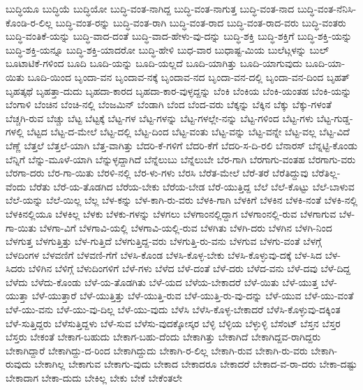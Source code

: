 {ಬುದ್ಧಿಯೂ
ಬುದ್ಧಿಯೆ
ಬುದ್ಧಿಯೋ
ಬುದ್ಧಿ-ವಂತ-ನಾಗಿದ್ದ
ಬುದ್ಧಿ-ವಂತ-ನಾಗುತ್ತ
ಬುದ್ಧಿ-ವಂತ-ನಾದ
ಬುದ್ಧಿ-ವಂತ-ನೆನಿಸಿ-ಕೊಂಡಿ-ರ-ಲಿಲ್ಲ
ಬುದ್ಧಿ-ವಂತ-ರನ್ನು
ಬುದ್ಧಿ-ವಂತ-ರಾಗಿ
ಬುದ್ಧಿ-ವಂತ-ರಾದ
ಬುದ್ಧಿ-ವಂತ-ರಾದ-ವರು
ಬುದ್ಧಿ-ವಂತರು
ಬುದ್ಧಿ-ವಂತಿಕೆ-ಯನ್ನು
ಬುದ್ಧಿ-ವಾದ-ದಂತೆ
ಬುದ್ಧಿ-ವಾದ-ಹೇಳು-ವು-ದನ್ನು
ಬುದ್ಧಿ-ಶಕ್ತಿ
ಬುದ್ಧಿ-ಶಕ್ತಿಗೆ
ಬುದ್ಧಿ-ಶಕ್ತಿ-ಯನ್ನು
ಬುದ್ಧಿ-ಶಕ್ತಿ-ಯನ್ನೂ
ಬುದ್ಧಿ-ಶಕ್ತಿ-ಯಾದರೋ
ಬುದ್ಧಿ-ಹೇಳಿ
ಬುಧ-ವಾರ
ಬುಧಾಷ್ಟ-ಮಿಯ
ಬುಲೆಟ್ಗಳನ್ನು
ಬುಲ್
ಬೂಟಾಟಿಕೆ-ಗಳಿಂದ
ಬೂದಿ
ಬೂದಿ-ಯನ್ನು
ಬೂದಿ-ಯಲ್ಲದೆ
ಬೂದಿ-ಯಾಗಿತ್ತು
ಬೂದಿ-ಯಾಗುವುದು
ಬೂದಿ-ಯಾ-ಯಿತು
ಬೂದಿ-ಯಿಂದ
ಬೃಂದಾ-ವನ
ಬೃಂದಾವ-ನಕ್ಕೆ
ಬೃಂದಾವ-ನದ
ಬೃಂದಾ-ವನ-ದಲ್ಲಿ
ಬೃಂದಾ-ವನ-ದಿಂದ
ಬೃಹತ್
ಬೃಹತ್ಕಥೆ
ಬೃಹತ್ತಾ-ದುದು
ಬೃಹದಾ-ಕಾರದ
ಬೃಹದಾ-ಕಾರ-ವುಳ್ಳದ್ದನ್ನು
ಬೆಂಕಿ
ಬೆಂಕಿಯ
ಬೆಂಕಿ-ಯಂತಹ
ಬೆಂಕಿ-ಯನ್ನು
ಬೆಂಗಾಳಿ
ಬೆಂಚಿನ
ಬೆಂಚಿ-ನಲ್ಲಿ
ಬೆಂಜಮಿನ್
ಬೆಂಡಾಗಿ
ಬೆಂದ
ಬೆಂದ-ವರು
ಬೆಕ್ಕನ್ನು
ಬೆಕ್ಕಿನ
ಬೆಕ್ಕು
ಬೆಕ್ಕು-ಗಳಂತೆ
ಬೆಚ್ಚಗಿ-ರುವ
ಬೆಚ್ಚು
ಬೆಟ್ಟ
ಬೆಟ್ಟಕ್ಕೆ
ಬೆಟ್ಟ-ಗಳ
ಬೆಟ್ಟ-ಗಳನ್ನು
ಬೆಟ್ಟ-ಗಳಲ್ಲೇ-ನನ್ನು
ಬೆಟ್ಟ-ಗಳಿಂದ
ಬೆಟ್ಟ-ಗಳು
ಬೆಟ್ಟ-ಗುಡ್ಡ-ಗಳಲ್ಲಿ
ಬೆಟ್ಟದ
ಬೆಟ್ಟ-ದ-ಮೇಲೆ
ಬೆಟ್ಟ-ದಲ್ಲಿ
ಬೆಟ್ಟ-ದಿಂದ
ಬೆಟ್ಟ-ವಂತು
ಬೆಟ್ಟ-ವನ್ನು
ಬೆಟ್ಟ-ವನ್ನೇ
ಬೆಟ್ಟ-ವಲ್ಲ
ಬೆಟ್ಟ-ವಿದೆ
ಬೆಣ್ಣೆ
ಬೆತ್ತಲೆ
ಬೆತ್ತಲೆ-ಯಾಗಿ
ಬೆತ್ತ-ವಾಗಿತ್ತು
ಬೆದರಿ-ಕೆ-ಗಳಿಗೆ
ಬೆದರಿ-ಕೆಗೆ
ಬೆದರಿ-ಸ-ದಿ-ರಲಿ
ಬೆನಾರಸ್
ಬೆನ್ನಟ್ಟಿ-ಕೊಂಡು
ಬೆನ್ನಿಗೆ
ಬೆನ್ನು-ಮೂಳೆ-ಯಾಗಿ
ಬೆನ್ನುಳ್ಳದ್ದಾಗಿದೆ
ಬೆನ್ನೆಲುಬು
ಬೆನ್ನೆಲುಬೇ
ಬೆರ-ಗಾಗಿ
ಬೆರಗಾಗು-ವಂತಹ
ಬೆರಗಾಗು-ವರು
ಬೆರಗಾ-ದರು
ಬೆರ-ಗಾ-ಯಿತು
ಬೆರಳಿ-ನಲ್ಲಿ
ಬೆರ-ಳು-ಗಳು
ಬೆರಸಿ
ಬೆರೆತ-ಮೇಲೆ
ಬೆರೆ-ತರೆ
ಬೆರೆತಿದ್ದುವು
ಬೆರೆತಿಲ್ಲ-ವೆಂದು
ಬೆರೆತು
ಬೆರೆ-ಯ-ತೊಡಗಿದ
ಬೆರೆಯ-ಬೇಕು
ಬೆರೆಯ-ಬೇಡ
ಬೆರೆ-ಯುತ್ತಿದ್ದ
ಬೆಲೆ
ಬೆಲೆ-ಕೊಟ್ಟು
ಬೆಲೆ-ಬಾಳುವ
ಬೆಲೆ-ಯನ್ನು
ಬೆಲೆ-ಯಿಲ್ಲ
ಬೆಲ್ಲ
ಬೆಳ-ಕನ್ನು
ಬೆಳ-ಕಾಗಿ-ರು-ವರು
ಬೆಳಕಿ-ಗಾಗಿ
ಬೆಳಕಿಗೆ
ಬೆಳಕಿನ
ಬೆಳಕಿ-ನಂತೆ
ಬೆಳಕಿ-ನಲ್ಲಿ
ಬೆಳಕಿನಲ್ಲಿಯೂ
ಬೆಳಕಿಲ್ಲ
ಬೆಳಕು
ಬೆಳಕು-ಗಳನ್ನು
ಬೆಳಗಲು
ಬೆಳಗಾಂನಲ್ಲಿದ್ದಾಗ
ಬೆಳಗಾಂನಲ್ಲಿ-ರುವ
ಬೆಳಗಾಗುವ
ಬೆಳ-ಗಾ-ಯಿತು
ಬೆಳಗಾ-ವಿಗೆ
ಬೆಳಗಾವಿ-ಯಲ್ಲಿ
ಬೆಳಗಾವಿ-ಯಲ್ಲಿ-ರುವ
ಬೆಳಗಿತು
ಬೆಳಗಿ-ದರು
ಬೆಳಗಿನ
ಬೆಳಗಿ-ನಿಂದ
ಬೆಳಗುತ್ತ
ಬೆಳಗುತ್ತಿತ್ತು
ಬೆಳ-ಗುತ್ತಿದೆ
ಬೆಳಗುತ್ತಿದ್ದ-ವರು
ಬೆಳಗುತ್ತಿ-ರು-ವನು
ಬೆಳಗುವ
ಬೆಳಗು-ವಂತೆ
ಬೆಳಗ್ಗೆ
ಬೆಳದಿಂಗಳ
ಬೆಳವಣಿಗೆ
ಬೆಳವಣಿ-ಗೆಗೆ
ಬೆಳಸಿ-ಕೊಂಡ
ಬೆಳಸಿ-ಕೊಳ್ಳ-ಬೇಕು
ಬೆಳಸಿ-ಕೊಳ್ಳುವು-ದಕ್ಕೆ
ಬೆಳ-ಸಿದ
ಬೆಳ-ಸಿದರು
ಬೆಳಿಗಿನ
ಬೆಳಿಗ್ಗೆ
ಬೆಳುದಿಂಗಳಿಗೆ
ಬೆಳೆ-ಗಳು
ಬೆಳೆದ
ಬೆಳೆ-ದಂತೆ
ಬೆಳೆ-ದರು
ಬೆಳೆದ-ವನು
ಬೆಳೆ-ದವು
ಬೆಳೆ-ದಿದ್ದ
ಬೆಳೆದು
ಬೆಳೆದು-ಕೊಂಡು
ಬೆಳೆ-ಯ-ತೊಡಗಿತು
ಬೆಳೆ-ಯದ
ಬೆಳೆಯ-ಬೇಕಾದರೆ
ಬೆಳೆ-ಯಿತು
ಬೆಳೆ-ಯುತ್ತ
ಬೆಳೆ-ಯುತ್ತಾ
ಬೆಳೆ-ಯುತ್ತಾರೆ
ಬೆಳೆ-ಯುತ್ತಿತ್ತು
ಬೆಳೆ-ಯುತ್ತಿ-ರುವ
ಬೆಳೆ-ಯುತ್ತಿ-ರು-ವು-ದನ್ನು
ಬೆಳೆ-ಯುವ
ಬೆಳೆ-ಯು-ವಂತೆ
ಬೆಳೆ-ಯು-ವನು
ಬೆಳೆ-ಯು-ವು-ದಿಲ್ಲ
ಬೆಳೆ-ಯು-ವುದು
ಬೆಳೆಸಿ
ಬೆಳೆಸಿ-ಕೊಳ್ಳ-ಬೇಕಾದರೆ
ಬೆಳೆಸಿ-ಕೊಳ್ಳುವು-ದಕ್ಕಿಂತ
ಬೆಳೆ-ಸುತ್ತಿದ್ದರು
ಬೆಳೆಸುತ್ತಿದ್ದಳು
ಬೆಳೆ-ಸುವ
ಬೆಳೆಸು-ವುದಕ್ಕೋಸ್ಕರ
ಬೆಳ್ಳಿ
ಬೆಳ್ಳಿಯ
ಬೆಳ್ಳುಳ್ಳಿ
ಬೆಸೆಂಟ್
ಬೆಸ್ತನ
ಬೆಸ್ತರ
ಬೆಸ್ತರು
ಬೇಕಂತೆ
ಬೇಕಾಗ-ಬಹುದು
ಬೇಕಾಗ-ಬಹು-ದೆಂದು
ಬೇಕಾಗಿತ್ತು
ಬೇಕಾಗಿದೆ
ಬೇಕಾಗಿದ್ದವ-ರಾಗಿದ್ದರು
ಬೇಕಾಗಿದ್ದಾರೆ
ಬೇಕಾಗಿದ್ದು-ದ-ರಿಂದ
ಬೇಕಾಗಿದ್ದುದು
ಬೇಕಾಗಿ-ರ-ಲಿಲ್ಲ
ಬೇಕಾಗಿ-ರುವ
ಬೇಕಾಗಿ-ರು-ವರು
ಬೇಕಾಗಿ-ರುವುದು
ಬೇಕಾಗಿಲ್ಲ
ಬೇಕಾಗುವ
ಬೇಕಾಗು-ವುದು
ಬೇಕಾದ
ಬೇಕಾದರೂ
ಬೇಕಾದರೆ
ಬೇಕಾದ-ವ-ರಾ-ದರು
ಬೇಕಾ-ದಷ್ಟು
ಬೇಕಾದಾಗ
ಬೇಕಾ-ದುದು
ಬೇಕಿಲ್ಲ
ಬೇಕು
ಬೇಕೆ
ಬೇಕೆಂತಲೇ
}
